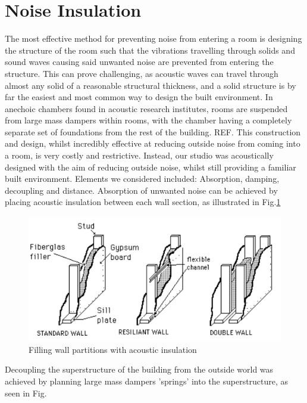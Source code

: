 \documentclass[10pt, twocolumn]{article}
\begin{document}
    \section{Noise Insulation}
        The most effective method for preventing noise from entering a room is designing the structure of the room such that the vibrations travelling through solids and sound waves causing said unwanted noise are prevented from entering the structure.
        This can prove challenging, as acoustic waves can travel through almost any solid of a reasonable structural thickness, and a solid structure is by far the easiest and most common way to design the built environment.
        In anechoic chambers found in acoustic research institutes, rooms are suspended from large mass dampers within rooms, with the chamber having a completely separate set of foundations from the rest of the building. REF.
        This construction and design, whilst incredibly effective at reducing outside noise from coming into a room, is very costly and restrictive.
        Instead, our studio was acoustically designed with the aim of reducing outside noise, whilst still providing a familiar built environment.
        Elements we considered included: Absorption, damping, decoupling and distance.
        Absorption of unwanted noise can be achieved by placing acoustic insulation between each wall section, as illustrated in Fig.\ref{wallFiller}
        \begin{figure}[H]
            \includegraphics[scale = 0.6]{resources/wallFiller.png}
            \caption{Filling wall partitions with acoustic insulation \cite{UCSC}}
            \label{wallFiller}
            \centering
        \end{figure}
        Decoupling the superstructure of the building from the outside world was achieved by planning large mass dampers 'springs' into the superstructure, as seen in Fig.
\end{document}
